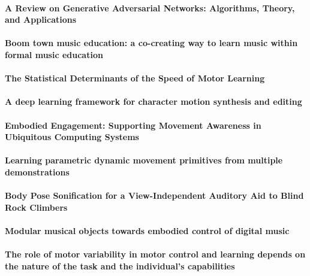 \documentclass[11pt]{article}
\begin{document}
\paragraph{A Review on Generative Adversarial Networks: Algorithms, Theory, and Applications} \citep{gui_review_2020}

\paragraph{Boom town music education: a co-creating way to learn music within formal music education} \citep{gullberg_boom_2006}

\paragraph{The Statistical Determinants of the Speed of Motor Learning} \citep{he_statistical_2016}

\paragraph{A deep learning framework for character motion synthesis and editing} \citep{holden_deep_2016}

\paragraph{Embodied Engagement: Supporting Movement Awareness in Ubiquitous Computing Systems}

\paragraph{Learning parametric dynamic movement primitives from multiple demonstrations} \citep{matsubara_learning_2011}

\paragraph{Body Pose Sonification for a View-Independent Auditory Aid to Blind Rock Climbers} \citep{ramsay_body_2020}

\paragraph{Modular musical objects towards embodied control of digital music} \citep{rasamimanana_modular_2011}

\paragraph{The role of motor variability in motor control and learning depends on the nature of the task and the individual’s capabilities} \citep{sanchez_role_2017}
\end{document}
